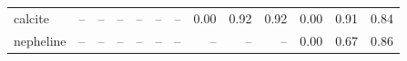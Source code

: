 \begin{table}[!htbp]
\begin{tabular}{@{}l|rrr|rrr|rrr|rrr@{}}
calcite & -- & -- & -- & -- & -- & -- & 0.00 & \cellcolor[RGB]{245,199,195}0.92 & \cellcolor[RGB]{245,199,195}0.92 & 0.00 & \cellcolor[RGB]{245,195,192}0.91 & \cellcolor[RGB]{236,146,139}0.84 \\
nepheline & -- & -- & -- & -- & -- & -- & -- & -- & -- & 0.00 & \cellcolor[RGB]{232,120,112}0.67 & \cellcolor[RGB]{239,159,153}0.86 \\
\bottomrule
\end{tabular}
\end{table}
